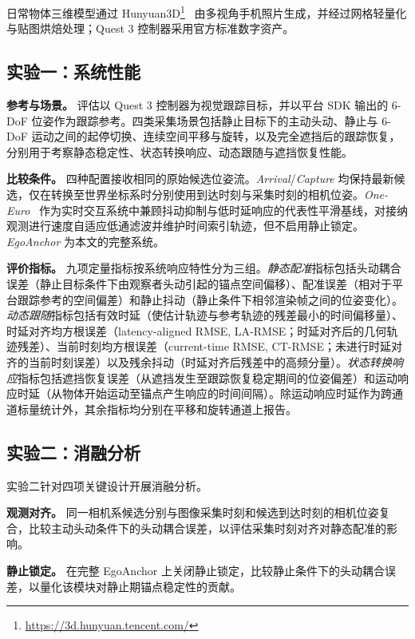 \documentclass[review]{vgtc}
\begin{document}
日常物体三维模型通过 Hunyuan3D\footnote{\url{https://3d.hunyuan.tencent.com/}}~\cite{hunyuan3d22025tencent} 由多视角手机照片生成，并经过网格轻量化与贴图烘焙处理；Quest 3 控制器采用官方标准数字资产。

\subsection{实验一：系统性能}\label{sec:exp1-design}

\textbf{参考与场景。}
评估以 Quest 3 控制器为视觉跟踪目标，并以平台 SDK 输出的 6-DoF 位姿作为跟踪参考。四类采集场景包括静止目标下的主动头动、静止与 6-DoF 运动之间的起停切换、连续空间平移与旋转，以及完全遮挡后的跟踪恢复，分别用于考察静态稳定性、状态转换响应、动态跟随与遮挡恢复性能。

\textbf{比较条件。}
四种配置接收相同的原始候选位姿流。\textit{Arrival}/\textit{Capture} 均保持最新候选，仅在转换至世界坐标系时分别使用到达时刻与采集时刻的相机位姿。\textit{One-Euro}~\cite{casiez2012oneeuro} 作为实时交互系统中兼顾抖动抑制与低时延响应的代表性平滑基线，对接纳观测进行速度自适应低通滤波并维护时间索引轨迹，但不启用静止锁定。\textit{EgoAnchor} 为本文的完整系统。

\textbf{评价指标。}
九项定量指标按系统响应特性分为三组。\textit{静态配准}指标包括头动耦合误差（静止目标条件下由观察者头动引起的锚点空间偏移）、配准误差（相对于平台跟踪参考的空间偏差）和静止抖动（静止条件下相邻渲染帧之间的位姿变化）。\textit{动态跟随}指标包括有效时延（使估计轨迹与参考轨迹的残差最小的时间偏移量）、时延对齐均方根误差（latency-aligned RMSE, LA-RMSE；时延对齐后的几何轨迹残差）、当前时刻均方根误差（current-time RMSE, CT-RMSE；未进行时延对齐的当前时刻误差）以及残余抖动（时延对齐后残差中的高频分量）。\textit{状态转换响应}指标包括遮挡恢复误差（从遮挡发生至跟踪恢复稳定期间的位姿偏差）和运动响应时延（从物体开始运动至锚点产生响应的时间间隔）。除运动响应时延作为跨通道标量统计外，其余指标均分别在平移和旋转通道上报告。

\subsection{实验二：消融分析}\label{sec:exp2-design}

实验二针对四项关键设计开展消融分析。

\textbf{观测对齐。}
同一相机系候选分别与图像采集时刻和候选到达时刻的相机位姿复合，比较主动头动条件下的头动耦合误差，以评估采集时刻对齐对静态配准的影响。

\textbf{静止锁定。}
在完整 EgoAnchor 上关闭静止锁定，比较静止条件下的头动耦合误差，以量化该模块对静止期锚点稳定性的贡献。
\end{document}
